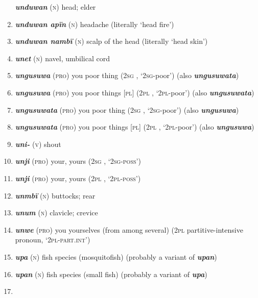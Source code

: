 \begin{enumerate}[noitemsep, label={}, align=left, widest=190, labelsep=1ex,leftmargin=*,itemindent=-10pt]
\textbf{\textit{unduwan}} (\textsc{n}) head; elder \item 
\textbf{\textit{unduwan apïn}} (\textsc{n}) headache (literally ‘head fire’) \item 
\textbf{\textit{unduwan nambï}} (\textsc{n}) scalp of the head (literally ‘head skin’) \item 
\textbf{\textit{unet}} (\textsc{n}) navel, umbilical cord \item 
\textbf{\textit{ungusuwa}} (\textsc{pro}) you poor thing (2\textsc{sg} , ‘\textsc{2sg}-poor’) (also \linebreak\textbf{\textit{ungusuwata}}) \item 
\textbf{\textit{ungusuwa}} (\textsc{pro}) you poor things [\textsc{pl}] (2\textsc{pl} , ‘\textsc{2pl}-poor’) (also \linebreak\textbf{\textit{ungusuwata}}) \item 
\textbf{\textit{ungusuwata}} (\textsc{pro}) you poor thing (2\textsc{sg} , ‘\textsc{2sg}-poor’) (also \linebreak \textbf{\textit{ungusuwa}}) \item 
\textbf{\textit{ungusuwata}} (\textsc{pro}) you poor things [\textsc{pl}] (2\textsc{pl} , ‘\textsc{2pl}-poor’) (also \textbf{\textit{ungusuwa}}) \item 
\textbf{\textit{uni-}} (\textsc{v}) shout \item 
\textbf{\textit{unji}} (\textsc{pro}) your, yours (2\textsc{sg} , ‘\textsc{2sg-poss}’) \item 
\textbf{\textit{unji}} (\textsc{pro}) your, yours (2\textsc{pl} , ‘\textsc{2pl-poss}’) \item 
\textbf{\textit{unmbï}} (\textsc{n}) buttocks; rear \item 
\textbf{\textit{unum}} (\textsc{n}) clavicle; crevice \item 
\textbf{\textit{unwe}} (\textsc{pro}) you yourselves (from among several) (\textsc{2pl} partitive-intensive \linebreak pronoun, ‘\textsc{2pl-part.int}’) \item 
\textbf{\textit{upa}} (\textsc{n}) fish species (mosquitofish) (probably a variant of \textbf{\textit{upan}}) \item 
\textbf{\textit{upan}} (\textsc{n}) fish species (small fish) (probably a variant of \textbf{\textit{upa}}) \item 

\end{enumerate}
